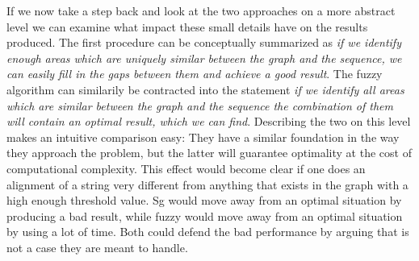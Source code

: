 \documentclass[thesis.tex]{subfiles}
\begin{document}
If we now take a step back and look at the two approaches on a more abstract level we can examine what impact these small details have on the results produced. The first procedure can be conceptually summarized as \textit{if we identify enough areas which are uniquely similar between the graph and the sequence, we can easily fill in the gaps between them and achieve a good result}. The fuzzy algorithm can similarily be contracted into the statement \textit{if we identify all areas which are similar between the graph and the sequence the combination of them will contain an optimal result, which we can find}. Describing the two on this level makes an intuitive comparison easy: They have a similar foundation in the way they approach the problem, but the latter will guarantee optimality at the cost of computational complexity. This effect would become clear if one does an alignment of a string very different from anything that exists in the graph with a high enough threshold value. Sg would move away from an optimal situation by producing a bad result, while fuzzy would move away from an optimal situation by using a lot of time. Both could defend the bad performance by arguing that is not a case they are meant to handle.
\label{sec:comparison_discussion}
\end{document}
